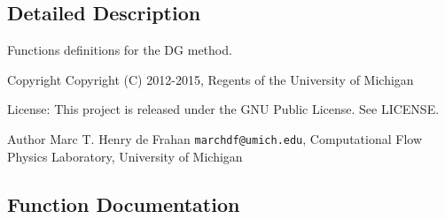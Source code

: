 \subsection{Detailed Description}
Functions definitions for the D\-G method. \begin{DoxyCopyright}{Copyright}
Copyright (C) 2012-\/2015, Regents of the University of Michigan 
\end{DoxyCopyright}
\begin{DoxyParagraph}{License\-:}
This project is released under the G\-N\-U Public License. See L\-I\-C\-E\-N\-S\-E. 
\end{DoxyParagraph}
\begin{DoxyAuthor}{Author}
Marc T. Henry de Frahan {\tt marchdf@umich.\-edu}, Computational Flow Physics Laboratory, University of Michigan 
\end{DoxyAuthor}


\subsection{Function Documentation}
